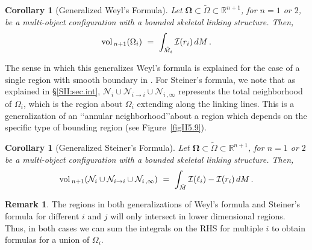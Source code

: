 \documentclass[10pt]{amsart}
\newtheorem{Corollary}[Thm]{Corollary}
\theoremstyle{definition}
\theoremstyle{definition}
\newtheorem{Remark}[Thm]{Remark}
\numberwithin{equation}{section}
\newcommand{\R}{{\mathbb R}}
\newcommand{\vol}{{\rm vol}\,}
\def \bgW {\boldsymbol \Omega}
\def \cI {\mathcal{I}}
\def \cN {\mathcal{N}}
\def \gW {\Omega}
\begin{document}
\begin{Corollary}[Generalized Weyl\rq s Formula]
\label{CorII5.9}
Let $\bgW \subset \tilde \gW \subset \R^{n+1}$, for $n = 1$ or $2$, be a 
multi-object configuration with a bounded skeletal linking structure.  
Then, 
\begin{equation}
\label{EqnII5.21}
\vol_{n+1}(\gW_i) \,\, = \,\,  \int_{\tilde M_i} \cI(r_i)\, dM\, . 
\end{equation} 
\end{Corollary}
The sense in which this generalizes Weyl\rq s formula is explained for the 
case of a single region with smooth boundary in \cite[\S 6, 7]{D4}.  For 
Steiner\rq s formula, we note that as explained in \S \ref{SII:sec.int},  
$\cN_i \cup \cN_{i\to i} \cup \cN_{i\, ,\infty}$ represents the total 
neighborhood of $\gW_i$, which is the region about $\gW_i$ extending 
along the linking lines.  This is a generalization of an \lq\lq annular 
neighborhood\rq\rq about a region which depends on the specific type of 
bounding region (see Figure~\ref{figII5.9}). 
\begin{Corollary}[Generalized Steiner\rq s Formula]
\label{CorII5.10}
Let $\bgW \subset \tilde \gW \subset \R^{n+1}$, for $n = 1$ or $2$ be a 
multi-object configuration with a bounded skeletal linking structure.  
Then,
\begin{equation}
\label{EqnII5.22}
\vol_{n+1}(\cN_i \cup \cN_{i\to i} \cup \cN_{i\, ,\infty} ) \,\, = \,\,  
\int_{\tilde 
M} \cI(\ell_i) - \cI(r_i)\, dM\, . 
\end{equation} 
\end{Corollary}
\par
\begin{Remark}
\label{RemII5.23}
\normalfont
The regions in both generalizations of Weyl\rq s formula and Steiner\rq s 
formula for different $i$ and $j$ will only intersect in lower dimensional 
regions.  Thus, in both cases we can sum the integrals on the RHS for 
multiple $i$ to obtain formulas for a union of $\gW_i$.
\end{Remark}
\par
\end{document}
